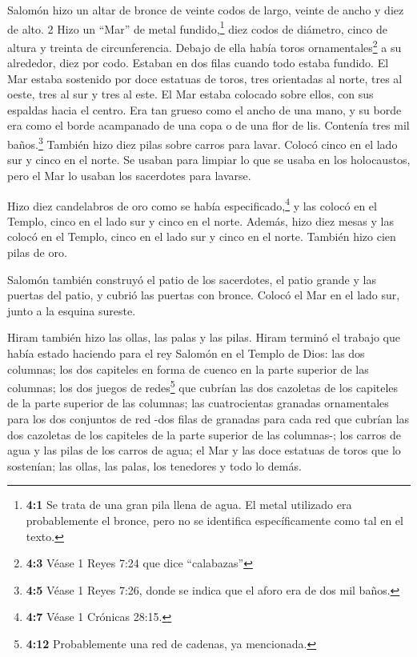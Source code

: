  Salomón hizo un altar de bronce de veinte codos de largo,
veinte de ancho y diez de alto. 2 Hizo un ``Mar'' de metal
fundido,\footnote{\textbf{4:1} Se trata de una gran pila llena de agua.
  El metal utilizado era probablemente el bronce, pero no se identifica
  específicamente como tal en el texto.} diez codos de diámetro, cinco
de altura y treinta de circunferencia.  Debajo de ella había
toros ornamentales\footnote{\textbf{4:3} Véase 1 Reyes 7:24 que dice
  ``calabazas''} a su alrededor, diez por codo. Estaban en dos filas
cuando todo estaba fundido.  El Mar estaba sostenido por
doce estatuas de toros, tres orientadas al norte, tres al oeste, tres al
sur y tres al este. El Mar estaba colocado sobre ellos, con sus espaldas
hacia el centro.  Era tan grueso como el ancho de una mano,
y su borde era como el borde acampanado de una copa o de una flor de
lis. Contenía tres mil baños.\footnote{\textbf{4:5} Véase 1 Reyes 7:26,
  donde se indica que el aforo era de dos mil baños.} 
También hizo diez pilas sobre carros para lavar. Colocó cinco en el lado
sur y cinco en el norte. Se usaban para limpiar lo que se usaba en los
holocaustos, pero el Mar lo usaban los sacerdotes para lavarse.

 Hizo diez candelabros de oro como se había
especificado,\footnote{\textbf{4:7} Véase 1 Crónicas 28:15.} y las
colocó en el Templo, cinco en el lado sur y cinco en el norte.
 Además, hizo diez mesas y las colocó en el Templo, cinco en
el lado sur y cinco en el norte. También hizo cien pilas de oro.

 Salomón también construyó el patio de los sacerdotes, el
patio grande y las puertas del patio, y cubrió las puertas con bronce.
 Colocó el Mar en el lado sur, junto a la esquina sureste.

 Hiram también hizo las ollas, las palas y las pilas. Hiram
terminó el trabajo que había estado haciendo para el rey Salomón en el
Templo de Dios:  las dos columnas; los dos capiteles en
forma de cuenco en la parte superior de las columnas; los dos juegos de
redes\footnote{\textbf{4:12} Probablemente una red de cadenas, ya
  mencionada.} que cubrían las dos cazoletas de los capiteles de la
parte superior de las columnas;  las cuatrocientas granadas
ornamentales para los dos conjuntos de red -dos filas de granadas para
cada red que cubrían las dos cazoletas de los capiteles de la parte
superior de las columnas-;  los carros de agua y las pilas
de los carros de agua;  el Mar y las doce estatuas de toros
que lo sostenían; las ollas, las palas, los tenedores y todo lo demás.

